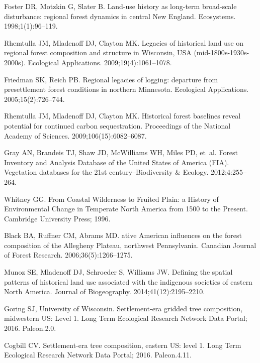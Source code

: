 \documentclass[10pt,letterpaper]{article}
\begin{document}
\begin{thebibliography}{10}
Foster DR, Motzkin G, Slater B.
\newblock Land-use history as long-term broad-scale disturbance: regional
  forest dynamics in central {N}ew {England}.
\newblock Ecosystems. 1998;1(1):96--119.

Rhemtulla JM, Mladenoff DJ, Clayton MK.
\newblock Legacies of historical land use on regional forest composition and
  structure in {W}isconsin, {USA} (mid-1800{s}-1930{s}-2000{s}).
\newblock Ecological Applications. 2009;19(4):1061--1078.

Friedman SK, Reich PB.
\newblock Regional legacies of logging: departure from presettlement forest
  conditions in northern {M}innesota.
\newblock Ecological Applications. 2005;15(2):726--744.

Rhemtulla JM, Mladenoff DJ, Clayton MK.
\newblock Historical forest baselines reveal potential for continued carbon
  sequestration.
\newblock Proceedings of the National Academy of Sciences.
  2009;106(15):6082--6087.

Gray AN, Brandeis TJ, Shaw JD, McWilliams WH, Miles PD, et~al.
\newblock Forest Inventory and Analysis Database of the {United States} of
  {America} ({FIA}).
\newblock Vegetation databases for the 21st century--Biodiversity \& Ecology.
  2012;4:255--264.

Whitney GG.
\newblock From Coastal Wilderness to Fruited Plain: a History of Environmental
  Change in Temperate {N}orth {A}merica from 1500 to the Present.
\newblock Cambridge University Press; 1996.

Black BA, Ruffner CM, Abrams MD.
ative {A}merican influences on the forest composition of the
  {A}llegheny {P}lateau, northwest {P}ennsylvania.
\newblock Canadian Journal of Forest Research. 2006;36(5):1266--1275.

Munoz SE, Mladenoff DJ, Schroeder S, Williams JW.
\newblock Defining the spatial patterns of historical land use associated with
  the indigenous societies of eastern {N}orth {A}merica.
\newblock Journal of Biogeography. 2014;41(12):2195--2210.

Goring SJ, {University of Wisconsin}.
\newblock Settlement-era gridded tree composition, midwestern {US}: Level 1.
\newblock Long Term Ecological Research Network Data Portal; 2016. Paleon.2.0.

Cogbill CV.
\newblock Settlement-era tree composition, eastern {US}: level 1.
\newblock Long Term Ecological Research Network Data Portal; 2016. Paleon.4.11.


\end{thebibliography}
\end{document}
